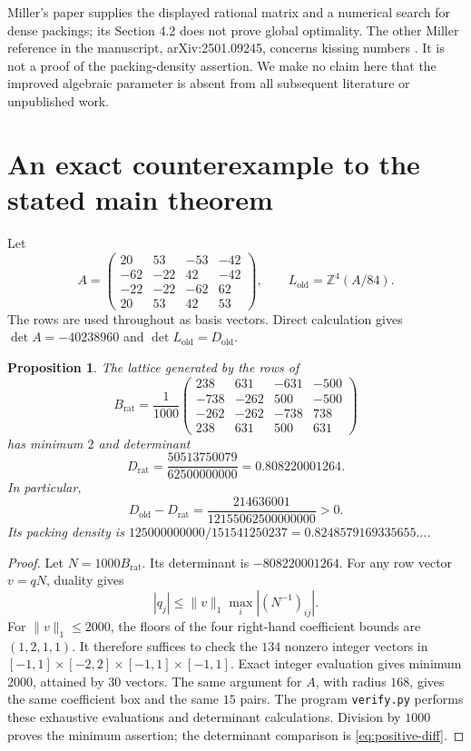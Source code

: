 \documentclass[11pt,reqno]{amsart}
\newtheorem{proposition}[theorem]{Proposition}
\theoremstyle{definition}
\newcommand{\Z}{\mathbb Z}
\newcommand{\norm}[1]{\lVert #1\rVert_1}
\newcommand{\Dold}{D_{\mathrm{old}}}
\begin{document}
Miller's paper \cite{Miller} supplies the displayed rational matrix and a
numerical search for dense packings; its Section 4.2 does not prove global
optimality. The other Miller reference in the manuscript, arXiv:2501.09245,
concerns kissing numbers \cite{MillerKissing}. It is not a proof of the
packing-density assertion. We make no claim here that the improved
algebraic parameter is absent from all subsequent literature or unpublished
work.

\section{An exact counterexample to the stated main theorem}\label{sec:counter}
Let
\[
 A=\begin{pmatrix}
20&53&-53&-42\\
-62&-22&42&-42\\
-22&-22&-62&62\\
20&53&42&53
\end{pmatrix},\qquad L_{\mathrm{old}}=\Z^4(A/84).
\]
The rows are used throughout as basis vectors. Direct calculation gives
$\det A=-40238960$ and $\det L_{\mathrm{old}}=\Dold$.

\begin{proposition}\label{prop:rational}
The lattice generated by the rows of
\begin{equation}\label{eq:rational}
 B_{\mathrm{rat}}=\frac1{1000}
 \begin{pmatrix}
238&631&-631&-500\\
-738&-262&500&-500\\
-262&-262&-738&738\\
238&631&500&631
\end{pmatrix}
\end{equation}
has minimum $2$ and determinant
\[
 D_{\mathrm{rat}}=\frac{50513750079}{62500000000}
 =0.808220001264.
\]
In particular,
\begin{equation}\label{eq:positive-diff}
 \Dold-D_{\mathrm{rat}}
 =\frac{214636001}{12155062500000000}>0.
\end{equation}
Its packing density is
$125000000000/151541250237=0.8248579169335655\ldots$.
\end{proposition}
\begin{proof}
Let $N=1000B_{\mathrm{rat}}$. Its determinant is $-808220001264$.
For any row vector $v=qN$, duality gives
\begin{equation}\label{eq:inverse-bound}
 |q_j|\le\norm{v}\max_i|(N^{-1})_{ij}|.
\end{equation}
For $\norm{v}\le2000$, the floors of the four right-hand coefficient
bounds are $(1,2,1,1)$. It therefore suffices to check the $134$ nonzero
integer vectors in
$[-1,1]\times[-2,2]\times[-1,1]\times[-1,1]$.
Exact integer evaluation gives minimum $2000$, attained by $30$ vectors.
The same argument for $A$, with radius $168$, gives the same coefficient
box and the same $15$ pairs. The program \texttt{verify.py} performs these
exhaustive evaluations and determinant calculations. Division by $1000$
proves the minimum assertion; the determinant comparison is
\eqref{eq:positive-diff}.
\end{proof}
\end{document}
